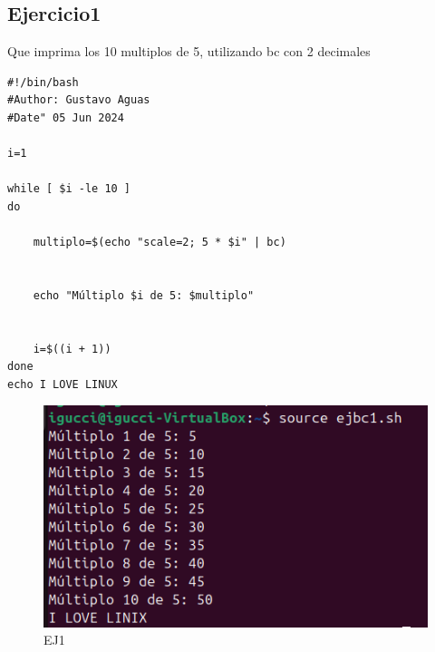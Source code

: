 \documentclass[11pt,twoside]{book}
\begin{document}
\subsection{Ejercicio1}
Que imprima los 10 multiplos de 5, utilizando bc con 2 decimales
\begin{lstlisting}
#!/bin/bash
#Author: Gustavo Aguas
#Date" 05 Jun 2024

i=1

while [ $i -le 10 ]
do
    
    multiplo=$(echo "scale=2; 5 * $i" | bc)

    
    echo "Múltiplo $i de 5: $multiplo"

    
    i=$((i + 1))
done
echo I LOVE LINUX
\end{lstlisting}
\begin{figure}
    \centering
    \includegraphics[width=1\linewidth]{ejbc1.png}
    \caption{EJ1}
\end{figure}
\end{document}
